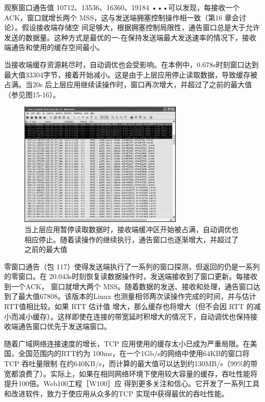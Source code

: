 观察窗口通告值 10712、13536、16360、19184 •••可以发现，每接收一个ACK，窗口就增长两个 MSS，这与发送端拥塞控制操作相一致（第16 章会讨论）。假设接收端存储空
间足够大，根据拥塞控制局限性，通告窗口总是大于允许发送的数据量。这种方式是最优的一-在保持发送端最大发送速率的情况下，接收端通告和使用的缓存空间最小。

当接收端缓存资源耗尽时，自动调优也会受影响。在本例中，0.678s时刻窗口达到最大值33304字节，接着开始减小。这是由于上层应用停止读取数据，导致缓存被占满。当20s
后上层应用继续读操作时，窗口再次增大，并超过了之前的最大值（参见图15-16）。
\begin{figure}[!htb]
    \centering
	\includegraphics[width=0.7\textwidth]{imgs/15/15-16.png}
	\caption{当上层应用暂停读取数据时，接收端缓冲区开始被占满，自动调优也相应停止。随着读操作的继续执行，通告窗口也逐渐增大，并超过了之前的最大值}
\end{figure}

零窗口通告（包 117）使得发送端执行了一系列的窗口探测，但返回的仍是一系列的零窗口。在 20.043s时刻恢复读数据操作时，发送端接收到了窗口更新。每接收到一个ACK，
窗口就增大两个 MSS。随着数据的发送、接收和处理，通告窗口达到了最大值67808。该版本的Linux 也测量相邻两次读操作完成的时间，并与估计 RTT值相比较。如果 RTT 估计值
增大，那么缓存也将增大（但不会因 RTT 的减小而减小缓存）。这样即使在连接的带宽延时积增大的情况下，自动调优也保持接收端通告窗口优先于发送端窗口。

随着广域网络连接速度的增长，TCP 应用使用的缓存太小已成为严重局限。在美国，全国范围内的RTT约为 100ms，在一个1Gb/s的网络中使用64KB的窗口将 TCP 吞吐量限制
在约640KB/s，而计算的最大值可以达到约130MB/s（99\%的带宽都浪费了）。实际上，如果在相同网络环境下使用较大容量的缓存，吞吐性能将提升100倍。Web100工程［W100］应
得到更多关注和信心。它开发了一系列工具和改进软件，致力于使应用从众多的TCP 实现中获得最优的吞吐性能。

